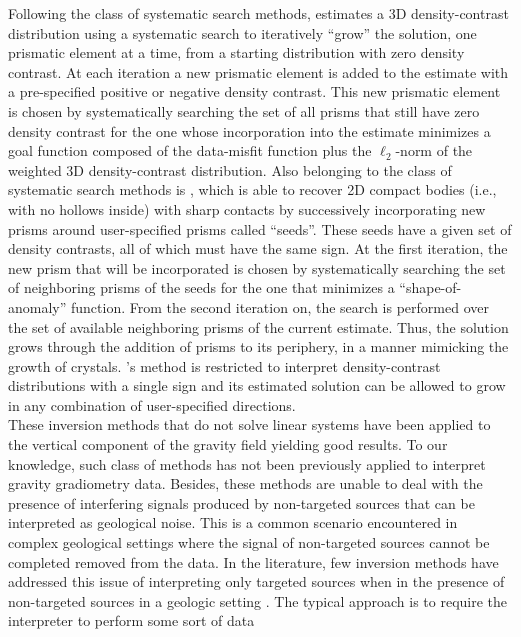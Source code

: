 Following the class of systematic search methods, \citet{camacho}
estimates a 3D density-contrast distribution using a systematic search to
iteratively ``grow'' the solution, one prismatic element at a time, from a
starting distribution with zero density contrast.
At each iteration a new prismatic element is added to the estimate with a
pre-specified positive or negative density contrast.
This new prismatic element is chosen by systematically searching the set of all
prisms that still have zero density contrast for the one whose incorporation
into the estimate minimizes a goal function composed of the data-misfit function
plus the $\ell_2$-norm of the weighted 3D density-contrast distribution.
Also belonging to the class of systematic search methods is \citet{rene}, which
is able to recover 2D compact bodies (i.e., with no hollows
inside) with sharp contacts by successively incorporating new prisms around
user-specified prisms called ``seeds''.
These seeds have a given set of density contrasts, all of which must have
the same sign.
At the first iteration, the new prism that will be incorporated is chosen by
systematically searching the set of neighboring prisms of the seeds for the one
that minimizes a ``shape-of-anomaly'' function.
From the second iteration on, the search is performed over the set of
available neighboring prisms of the current estimate.
Thus, the solution grows through the addition of prisms to its periphery, in a
manner mimicking the growth of crystals.
\citeauthor{rene}'s \citeyearpar{rene} method
is restricted to interpret density-contrast distributions with a single
sign and its estimated solution can be allowed to grow in any
combination of user-specified directions.
\\ \indent
These inversion methods that do not solve linear systems have been applied to
the vertical component of the gravity field yielding good results.
To our knowledge, such class of methods has not been previously applied to
interpret gravity gradiometry data.
Besides, these methods are unable to deal with the presence of
interfering signals produced by non-targeted
sources that can be interpreted as geological noise.
This is a common scenario encountered in complex geological settings where the
signal of non-targeted sources cannot be
completed removed from the data.
In the literature, few inversion methods have addressed this issue of
interpreting only targeted sources when in the presence of non-targeted sources
in a geologic setting \citep[e.g.,][]{silva_holmann, silva_cutrim, silvadias07}.
The typical approach is to require the interpreter to perform some sort of data
